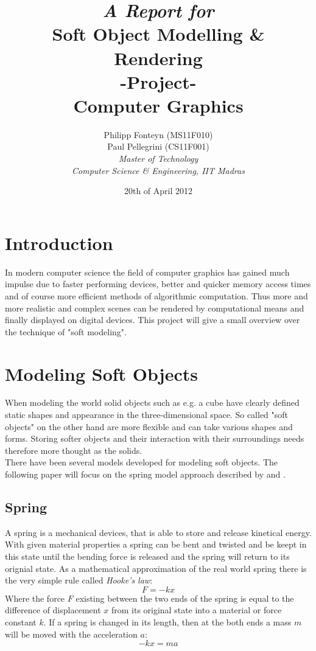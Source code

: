 \documentclass[11pt]{article}
\title{
	\emph{A Report for}\\
	\huge{\textbf{Soft Object Modelling \& Rendering} }\\
	-Project-\\
	Computer Graphics\\[2em]	
}
\author{
	Philipp Fonteyn (MS11F010)\\
	Paul Pellegrini (CS11F001)\\[2em]
	\emph{Master of Technology}\\
	\emph{Computer Science \& Engineering, IIT Madras}
}
\date{20th of April 2012}
\begin{document}
\maketitle
\newpage

%
%
%
\section{Introduction}
In modern computer science the field of computer graphics has gained much impulse due to faster performing devices, better and quicker memory access times and of course more efficient methods of algorithmic computation. Thus more and more realistic and complex scenes can be rendered by computational means and finally displayed on digital devices. This project will give a small overview over the technique of "soft modeling".
%
%
%
\section{Modeling Soft Objects}
When modeling the world solid objects such as e.g. a cube have clearly defined static shapes and appearance in the three-dimensional space. So called "soft objects" on the other hand are more flexible and can take various shapes and forms. Storing softer objects and their interaction with their surroundings needs therefore more thought as the solids.\\[1em]
%
There have been several models developed for modeling soft objects. The following paper will focus on the spring model approach described by \cite{LSCS} and \cite{hair}\cite{gama}.\\[1em]
%
\subsection{Spring}
A spring is a mechanical devices, that is able to store and release kinetical energy. With given material properties a spring can be bent and twisted and be keept in this state until the bending force is released and the spring will return to its orignial state. As a mathematical approximation of the real world spring there is the very simple rule called \textit{Hooke's law}:
$$F=-kx$$
Where the force $F$ existing between the two ends of the spring is equal to the difference of displacement $x$ from its original state into a material or force constant $k$. If a spring is changed in its length, then at the both ends a mass $m$ will be moved with the acceleration $a$:
$$-kx = ma$$
\end{document}
